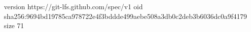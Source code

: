 version https://git-lfs.github.com/spec/v1
oid sha256:9694bd19785ca978722e4f3bddde499aebe508a3db0c2deb3b6036dc0a9f4179
size 71
